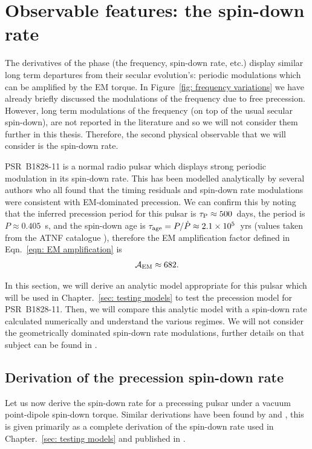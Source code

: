 \documentclass[../full_thesis/full_thesis.tex]{subfiles}
\begin{document}
\section{Observable features: the spin-down rate}
\label{sec: observable features: spin-down rate}

The derivatives of the phase (the frequency, spin-down rate, etc.) display
similar long term departures from their secular evolution's: periodic
modulations which can be amplified by the EM torque. In Figure~\ref{fig:
frequency variations} we have already briefly discussed the modulations of the
frequency due to free precession. However, long term modulations of the
frequency (on top of the usual secular spin-down), are not reported in the
literature and so we will not consider them further in this thesis. Therefore,
the second physical observable that we will consider is the spin-down rate.

PSR~B1828-11 is a normal radio pulsar which displays strong periodic modulation
in its spin-down rate. This has been modelled analytically by several authors
\citep{Stairs2000, Jones2001, Link2001, Akgun2006} who all found that the timing
residuals and spin-down rate modulations were consistent with EM-dominated
precession. We can confirm this by noting that the inferred precession period for this
pulsar is $\tau_{\mathrm{P}} \approx 500$~days, the period is $P\approx0.405$~s, and
the spin-down age is $\tau_{\mathrm{age}} = P/\dot{P} \approx 2.1 \times10^{5}$~yrs (values
taken from the ATNF catalogue \citet{ATNF}), therefore the EM amplification factor
defined in Eqn.~\ref{eqn: EM amplification} is
\begin{align}
\mathcal{A}_{\mathrm{EM}} \approx 682.
\end{align}

In this section, we will derive an analytic model appropriate for this pulsar
which will be used in Chapter.~\ref{sec: testing models} to test the precession
model for PSR~B1828-11. Then, we will compare this analytic model with a
spin-down rate calculated numerically and understand the various regimes. We
will not consider the geometrically dominated spin-down rate modulations,
further details on that subject can be found in \citet{Jones2001}.

\subsection{Derivation of the precession spin-down rate}
\label{sec: derivation of the spin-down rate}
Let us now derive the spin-down rate for a precessing pulsar under a
vacuum point-dipole spin-down torque. Similar derivations have been found by
\citet{Link2001} and \citet{Jones2001}, this is given primarily as a complete
derivation of the spin-down rate used in Chapter.~\ref{sec: testing models}
and published in \citet{Ashton2016}.
\end{document}
